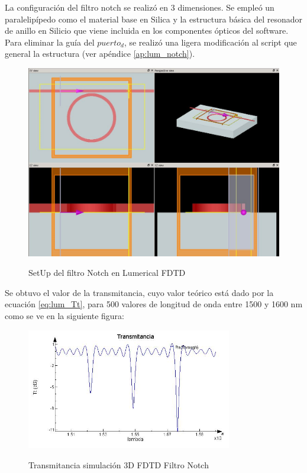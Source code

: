La configuración del filtro notch se realizó en 3 dimensiones. Se empleó un paralelipípedo
como el material base en Silica y la estructura básica del resonador de anillo en
Silicio que viene incluida en los componentes ópticos del software.
Para eliminar la guía del $puerto_d$, se realizó una ligera modificación
al script que general la estructura (ver apéndice \ref{ap:lum_notch}).

\begin{figure}[H]
\caption{SetUp del filtro Notch en Lumerical FDTD}
\centering
\includegraphics[width=1.0\textwidth,natwidth=1066,natheight=799]{figs/lum_setup_n.jpg}
\label{fig:lum_setup_n}
\end{figure} 

Se obtuvo el valor de la transmitancia, cuyo valor teórico está dado por la 
ecuación \ref{eq:lum_Tt}, para 500 valores de longitud de onda entre 1500 y
1600 nm como se ve en la siguiente figura:

\begin{figure}[H]
\caption{Transmitancia simulación 3D FDTD Filtro Notch}
\centering
\includegraphics[width=0.8\textwidth,natwidth=605,natheight=356]{figs/lum_t_n.jpg}
\label{fig:lum_t_fdtd_n}
\end{figure} 


